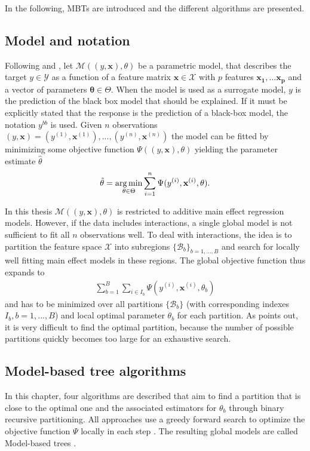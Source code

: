 In the following, MBTs are introduced and the different algorithms are presented.

\subsection{Model and notation}
Following \citep{Zeileis.2008} and \citep{Seibold.2016}, let $\mathcal{M}((y, \mathbf{x}), \theta)$ be a parametric model, that describes the target $y \in \mathcal{Y}$ as a function of a feature matrix $\mathbf{x}\in \mathcal{X}$ with $p$ features $\mathbf{x_1}, ... \mathbf{x_p} $  and a vector of parameters $\mathbf{\theta} \in \Theta$. When the model is used as a surrogate model, $y$ is the prediction of the black box model that should be explained.  If it must be explicitly stated that the response is the prediction of a black-box model, the notation $y^{bb}$ is used. Given $n$ observations $(y, \mathbf{x}) = (y^{(1)}, \mathbf{x}^{(1)}),..., (y^{(n)}, \mathbf{x}^{(n)})$ the model can be fitted by minimizing some objective function $\Psi((y, \mathbf{x}), \theta)$ yielding the parameter estimate $\hat{\theta}$
\begin{align}
    \hat{\mathbf{\theta}} = \operatorname*{arg\,min}_{\theta \in \Theta} \sum_{i=1}^{n}\Psi(y^{(i)}, \mathbf{x}^{(i)}, \theta).
\end{align}

In this thesis $\mathcal{M}((y, \mathbf{x}), \theta)$ is restricted to additive main effect regression models. However, if the data includes interactions, a single global model is not sufficient to fit all $n$ observations well.  To deal with interactions, the idea is to partition the feature space $\mathcal{X}$ into subregions $\{\mathcal{B}_b\}_{b = 1,...,B}$ and search for locally well fitting main effect models in these regions. The global objective function thus expands to
\begin{align}
    \sum_{b=1}^B\sum_{i \in I_b}\Psi(y^{(i)}, \mathbf{x}^{(i)}, \theta_b)
\end{align}
and has to be minimized over all partitions $\{\mathcal{B}_b\}$ (with corresponding indexes $I_b, b = 1,...,B$) and local optimal parameter $\theta_b$ for each partition. As \citep{Zeileis.2008} points out, it is very difficult to find the optimal partition, because the number of possible partitions quickly becomes too large for an exhaustive search.





\subsection{Model-based tree algorithms}
In this chapter, four algorithms are described that aim to find a partition that is close to the optimal one and the associated estimators for $\theta_b$ through binary recursive partitioning. All approaches use a greedy forward search to optimize the objective function $\Psi$ locally in each step \citep{Zeileis.2008}.  
The resulting global models are called Model-based trees .



